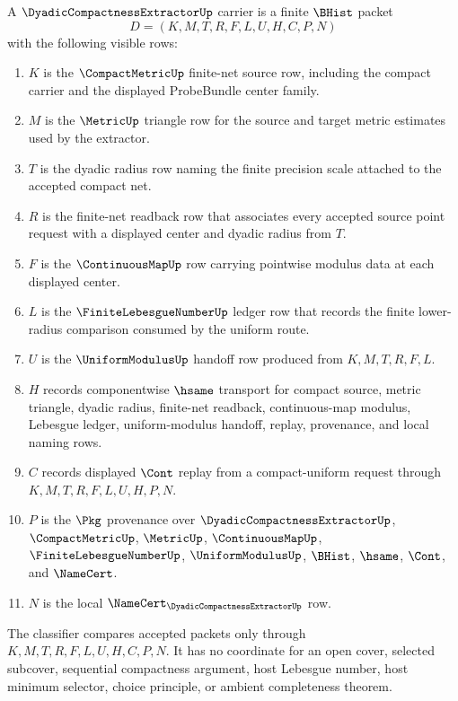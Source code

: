 \begin{definition}
\label{def:dyadic-compactness-extractor-carrier}
A $\DyadicCompactnessExtractorUp$ carrier is a finite $\BHist$ packet
$$
D=(K,M,T,R,F,L,U,H,C,P,N)
$$
with the following visible rows:
\begin{enumerate}
\item $K$ is the $\CompactMetricUp$ finite-net source row, including the compact carrier and the displayed ProbeBundle center family.
\item $M$ is the $\MetricUp$ triangle row for the source and target metric estimates used by the extractor.
\item $T$ is the dyadic radius row naming the finite precision scale attached to the accepted compact net.
\item $R$ is the finite-net readback row that associates every accepted source point request with a displayed center and dyadic radius from $T$.
\item $F$ is the $\ContinuousMapUp$ row carrying pointwise modulus data at each displayed center.
\item $L$ is the $\FiniteLebesgueNumberUp$ ledger row that records the finite lower-radius comparison consumed by the uniform route.
\item $U$ is the $\UniformModulusUp$ handoff row produced from $K,M,T,R,F,L$.
\item $H$ records componentwise $\hsame$ transport for compact source, metric triangle, dyadic radius, finite-net readback, continuous-map modulus, Lebesgue ledger, uniform-modulus handoff, replay, provenance, and local naming rows.
\item $C$ records displayed $\Cont$ replay from a compact-uniform request through $K,M,T,R,F,L,U,H,P,N$.
\item $P$ is the $\Pkg$ provenance over $\DyadicCompactnessExtractorUp$, $\CompactMetricUp$, $\MetricUp$, $\ContinuousMapUp$, $\FiniteLebesgueNumberUp$, $\UniformModulusUp$, $\BHist$, $\hsame$, $\Cont$, and $\NameCert$.
\item $N$ is the local $\NameCert_{\DyadicCompactnessExtractorUp}$ row.
\end{enumerate}
The classifier compares accepted packets only through $K,M,T,R,F,L,U,H,C,P,N$. It has no coordinate for an open cover, selected subcover, sequential compactness argument, host Lebesgue number, host minimum selector, choice principle, or ambient completeness theorem.
\end{definition}

